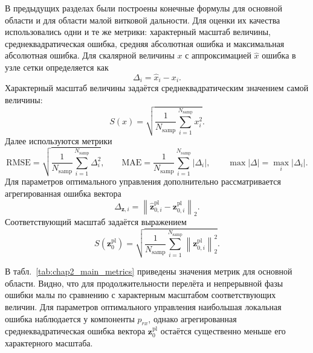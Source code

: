 В предыдущих разделах были построены конечные формулы для основной области и для области малой витковой дальности. Для оценки их качества использовались одни и те же метрики: характерный масштаб величины, среднеквадратическая ошибка, средняя абсолютная ошибка и максимальная абсолютная ошибка. Для скалярной величины $x$ с аппроксимацией $\widehat{x}$ ошибка в узле сетки определяется как
\begin{equation}
	\Delta_i=\widehat{x}_i-x_i.
\end{equation}
Характерный масштаб величины задаётся среднеквадратическим значением самой величины:
\begin{equation}
	S(x)=
	\sqrt{
		\frac{1}{N_{\mathrm{samp}}}
		\sum_{i=1}^{N_{\mathrm{samp}}}x_i^2
	}.
\end{equation}
Далее используются метрики
\begin{equation}
	\mathrm{RMSE}=
	\sqrt{
		\frac{1}{N_{\mathrm{samp}}}
		\sum_{i=1}^{N_{\mathrm{samp}}}\Delta_i^2
	},
	\qquad
	\mathrm{MAE}=
	\frac{1}{N_{\mathrm{samp}}}
	\sum_{i=1}^{N_{\mathrm{samp}}}|\Delta_i|,
	\qquad
	\max |\Delta|=\max_i |\Delta_i|.
\end{equation}
Для параметров оптимального управления дополнительно рассматривается агрегированная ошибка вектора
\begin{equation}
	\Delta_{\mathbf z,i}
	=
	\left\|
	\widehat{\mathbf z}^{\mathrm{pl}}_{0,i}
	-
	\mathbf z^{\mathrm{pl}}_{0,i}
	\right\|_2.
\end{equation}
Соответствующий масштаб задаётся выражением
\begin{equation}
	S(\mathbf z^{\mathrm{pl}}_0)=
	\sqrt{
		\frac{1}{N_{\mathrm{samp}}}
		\sum_{i=1}^{N_{\mathrm{samp}}}
		\left\|
		\mathbf z^{\mathrm{pl}}_{0,i}
		\right\|_2^2
	}.
\end{equation}

В табл.~\ref{tab:chap2_main_metrics} приведены значения метрик для основной области. Видно, что для продолжительности перелёта и непрерывной фазы ошибки малы по сравнению с характерным масштабом соответствующих величин. Для параметров оптимального управления наибольшая локальная ошибка наблюдается у компоненты $p_{rx}$, однако агрегированная среднеквадратическая ошибка вектора $\mathbf z^{\mathrm{pl}}_0$ остаётся существенно меньше его характерного масштаба.

